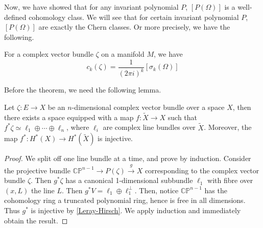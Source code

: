 	Now, we have showed that for any invariant polynomial $P$, $[P(\Omega)]$ is a well-defined cohomology class. We will see that for certain invariant polynomial $P$, $[P(\Omega)]$ are exactly the Chern classes. Or more precisely, we have the following. 
	\begin{thm}\label{Chern_Weil}
		For a complex vector bundle $\zeta$ on a manifold $M$, we have 
		\[ c_k(\zeta)=\frac{1}{(2\pi i)^k}[\sigma_k(\Omega)] \]
	\end{thm}
	Before the theorem, we need the following lemma. 
	\begin{lemma}\label{Splitting_principle}
		Let $\zeta:E\to X$ be an $n$-dimensional complex vector bundle over a space $X$, then there exists a space equipped with a map $f:\tilde{X}\to X$ such that $f^*\zeta\simeq\ell_1\oplus\cdots\oplus\ell_n$, where $\ell_i$ are complex line bundles over $\tilde{X}$. Moreover, the map $f^*:H^*(X)\to H^*(\tilde{X})$ is injective. 
	\end{lemma}
	\begin{proof}
		We split off one line bundle at a time, and prove by induction. Consider the projective bundle $\mathbb{CP}^{n-1}\to P(\zeta)\xrightarrow{g}X$ corresponding to the complex vector bundle $\zeta$. Then $g^*\zeta$ has a canonical 1-dimensional subbundle $\ell_1$ with fibre over $(x,L)$ the line $L$. Then $g^*V=\ell_1\oplus\ell_1^\perp$. Then, notice $\mathbb{CP}^{n-1}$ has the cohomology ring a truncated polynomial ring, hence is free in all dimensions. Thus $g^*$ is injective by \cref{Leray-Hirsch}. We apply induction and immediately obtain the result. 
	\end{proof}
